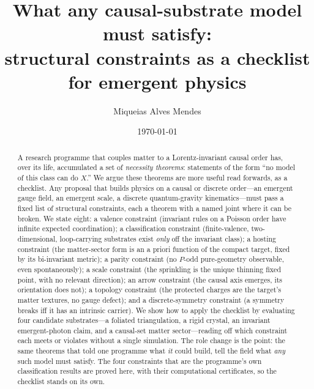 \documentclass[aps,prd,reprint,nofootinbib,superscriptaddress,floatfix]{revtex4-2}
\begin{document}
\title{What any causal-substrate model must satisfy:\\
structural constraints as a checklist for emergent physics}

\author{Miqueias Alves Mendes}
\date{\today}

\begin{abstract}
A research programme that couples matter to a Lorentz-invariant causal order has,
over its life, accumulated a set of \emph{necessity theorems}: statements of the form
``no model of this class can do $X$.'' We argue these theorems are more useful read
forwards, as a checklist. Any proposal that builds physics on a causal or discrete
order---an emergent gauge field, an emergent scale, a discrete quantum-gravity
kinematics---must pass a fixed list of structural constraints, each a theorem with a
named joint where it can be broken. We state eight: a valence constraint (invariant rules
on a Poisson order have infinite expected coordination); a classification constraint
(finite-valence, two-dimensional, loop-carrying substrates exist \emph{only} off the
invariant class); a hosting constraint (the matter-sector form is an a priori function
of the compact target, fixed by its bi-invariant metric); a parity constraint (no
$P$-odd pure-geometry observable, even spontaneously); a scale constraint (the sprinkling
is the unique thinning fixed point, with no relevant direction); an arrow constraint
(the causal axis emerges, its orientation does not); a topology constraint (the protected
charges are the target's matter textures, no gauge defect); and a discrete-symmetry
constraint (a symmetry breaks iff it has an intrinsic carrier). We show how to apply the checklist by
evaluating four candidate substrates---a foliated triangulation, a rigid crystal, an
invariant emergent-photon claim, and a causal-set matter sector---reading off which
constraint each meets or violates without a single simulation. The role change is the
point: the same theorems that told one programme what \emph{it} could build, tell the
field what \emph{any} such model must satisfy. The four constraints that are the programme's own
classification results are proved here, with their computational certificates, so the checklist
stands on its own.
\end{abstract}

\maketitle
\end{document}
